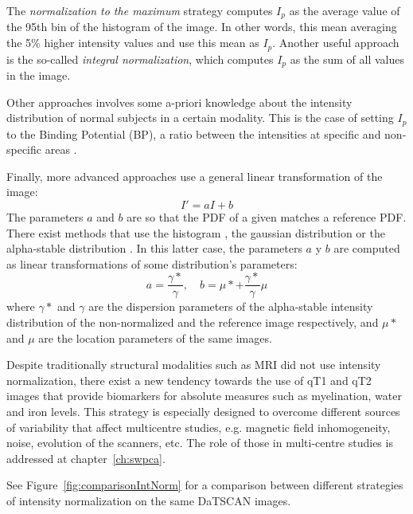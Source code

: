 The \emph{normalization to the maximum} strategy computes $I_p$ as the average value of the 95th bin of the histogram of the image. In other words, this mean averaging the 5\% higher intensity values and use this mean as $I_p$. Another useful approach is the so-called \emph{integral normalization}, which computes $I_p$ as the sum of all values in the image. 

Other approaches involves some a-priori knowledge about the intensity distribution of normal subjects in a certain modality. This is the case of setting $I_p$ to the Binding Potential (BP), a ratio between the intensities at specific and non-specific areas \cite{Scherfler2005}. 

Finally, more advanced approaches use a general linear transformation of the image: 
\begin{equation}
	I' = a I + b
\end{equation}
The parameters $a$ and $b$ are so that the \ac{PDF} of a given matches a reference \ac{PDF}. There exist methods that use the histogram \cite{Arndt1996}, the gaussian distribution or the alpha-stable distribution \cite{Salas-Gonzalez2013}. In this latter case, the parameters $a$ y $b$ are computed as linear transformations of some distribution's parameters: 
\begin{equation}
	a = \frac{\gamma*}{\gamma}, \quad b = \mu* + \frac{\gamma*}{\gamma} \mu
\end{equation}
where $\gamma*$ and $\gamma$ are the dispersion parameters of the alpha-stable intensity distribution of the non-normalized and the reference image respectively, and $\mu*$ and $\mu$ are the location parameters of the same images. 

Despite traditionally structural modalities such as \ac{MRI} did not use intensity normalization, there exist a new tendency towards the use of \ac{qT1} and \ac{qT2} images \cite{Weiskopf2013} that provide biomarkers for absolute measures such as myelination, water and iron levels. This strategy is especially designed to overcome different sources of variability that affect multicentre studies, e.g. magnetic field inhomogeneity, noise, evolution of the scanners, etc. The role of those in multi-centre studies is addressed at chapter~\ref{ch:swpca}. 

See Figure~\ref{fig:comparisonIntNorm} for a comparison between different strategies of intensity normalization on the same DaTSCAN images. 

